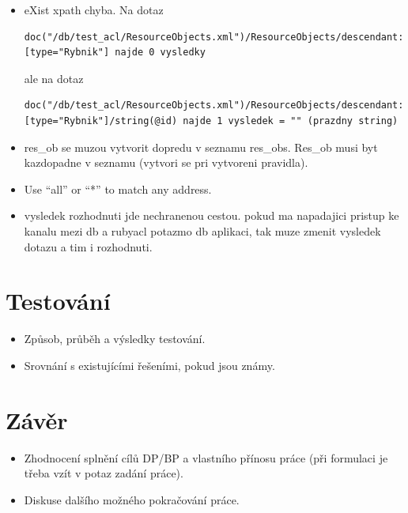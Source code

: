 \documentclass[11pt,twoside,a4paper]{book}
\begin{document}
\begin{itemize}
\item eXist xpath chyba. Na dotaz 
\begin{verbatim}
doc("/db/test_acl/ResourceObjects.xml")/ResourceObjects/descendant::*[type="Rybnik"] najde 0 vysledky
\end{verbatim}
ale na dotaz 
\begin{verbatim}
doc("/db/test_acl/ResourceObjects.xml")/ResourceObjects/descendant::*[type="Rybnik"]/string(@id) najde 1 vysledek = "" (prazdny string)
\end{verbatim}

\item res\_ob se muzou vytvorit dopredu v seznamu res\_obs. Res\_ob musi byt kazdopadne v seznamu (vytvori se pri vytvoreni pravidla).

\item Use “all” or “*” to match any address.

\item vysledek rozhodnuti jde nechranenou cestou. pokud ma napadajici pristup ke kanalu mezi db a rubyacl potazmo db aplikaci, tak muze zmenit vysledek dotazu a tim i rozhodnuti.

\end{itemize}
\chapter{Testování}

\begin{itemize}
 \item Způsob, průběh a výsledky testování.
 \item Srovnání s existujícími řešeními, pokud jsou známy.
\end{itemize} 


\chapter{Závěr}

\begin{itemize}
\item Zhodnocení splnění cílů DP/BP a  vlastního přínosu práce (při formulaci je třeba vzít v potaz zadání práce).
\item Diskuse dalšího možného pokračování práce.
\end{itemize} 

\end{document}
